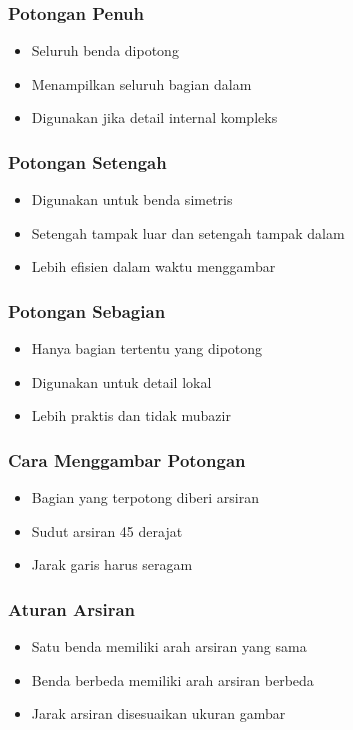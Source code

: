 \documentclass[../gbr_teknik.tex]{subfiles}
\begin{document}
\begin{frame}[mytitle=standard,t,mycolor=digiPH_leaf,dark]\frametitle{Potongan Penuh}
	\begin{itemize}
		\item Seluruh benda dipotong
		\item Menampilkan seluruh bagian dalam
		\item Digunakan jika detail internal kompleks
	\end{itemize}\end{frame}

\begin{frame}[mytitle=standard,t,mycolor=digiPH_ocean,dark]
	\frametitle{Potongan Setengah}
	\begin{itemize}
		\item Digunakan untuk benda simetris
		\item Setengah tampak luar dan setengah tampak dalam
		\item Lebih efisien dalam waktu menggambar
	\end{itemize}
\end{frame}


\begin{frame}[mytitle=standard,t,mycolor=digiPH_gray,light]
	\frametitle{Potongan Sebagian}
	\begin{itemize}
		\item Hanya bagian tertentu yang dipotong
		\item Digunakan untuk detail lokal
		\item Lebih praktis dan tidak mubazir
	\end{itemize}
\end{frame}

\begin{frame}[mytitle=standard,t,mycolor=digiPH_ubcblue,dark]

	\frametitle{Cara Menggambar Potongan}
	\begin{itemize}
		\item Bagian yang terpotong diberi arsiran
		\item Sudut arsiran 45 derajat
		\item Jarak garis harus seragam
	\end{itemize}
\end{frame}

\begin{frame}[mytitle=standard,t,mycolor=digiPH_red,dark]
	\frametitle{Aturan Arsiran}
	\begin{itemize}
		\item Satu benda memiliki arah arsiran yang sama
		\item Benda berbeda memiliki arah arsiran berbeda
		\item Jarak arsiran disesuaikan ukuran gambar
	\end{itemize}
\end{frame}
\end{document}
